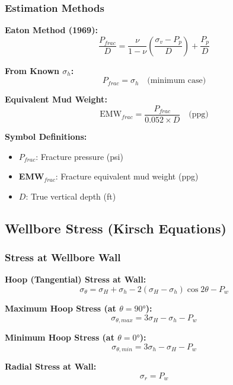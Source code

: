 \documentclass[11pt,a4paper]{article}
\newcommand{\symitem}[2]{\item \textbf{#1}: #2}
\begin{document}
\subsubsection{Estimation Methods}

\begin{tcolorbox}[colback=formulabox,colframe=black!75]
\textbf{Eaton Method (1969):}
\begin{equation}
\frac{P_{frac}}{D} = \frac{\nu}{1-\nu}\left(\frac{\sigma_v - P_p}{D}\right) + \frac{P_p}{D}
\end{equation}

\textbf{From Known $\sigma_h$:}
\begin{equation}
P_{frac} = \sigma_h \quad \text{(minimum case)}
\end{equation}

\textbf{Equivalent Mud Weight:}
\begin{equation}
\text{EMW}_{frac} = \frac{P_{frac}}{0.052 \times D} \quad \text{(ppg)}
\end{equation}
\end{tcolorbox}

\textbf{Symbol Definitions:}
\begin{itemize}[leftmargin=2cm]
\symitem{$P_{frac}$}{Fracture pressure (psi)}
\symitem{EMW$_{frac}$}{Fracture equivalent mud weight (ppg)}
\symitem{$D$}{True vertical depth (ft)}
\end{itemize}

\subsection{Wellbore Stress (Kirsch Equations)}

\subsubsection{Stress at Wellbore Wall}

\begin{tcolorbox}[colback=formulabox,colframe=black!75]
\textbf{Hoop (Tangential) Stress at Wall:}
\begin{equation}
\sigma_\theta = \sigma_H + \sigma_h - 2(\sigma_H - \sigma_h)\cos 2\theta - P_w
\end{equation}

\textbf{Maximum Hoop Stress (at $\theta = 90°$):}
\begin{equation}
\sigma_{\theta,max} = 3\sigma_H - \sigma_h - P_w
\end{equation}

\textbf{Minimum Hoop Stress (at $\theta = 0°$):}
\begin{equation}
\sigma_{\theta,min} = 3\sigma_h - \sigma_H - P_w
\end{equation}

\textbf{Radial Stress at Wall:}
\begin{equation}
\sigma_r = P_w
\end{equation}
\end{tcolorbox}
\end{document}
